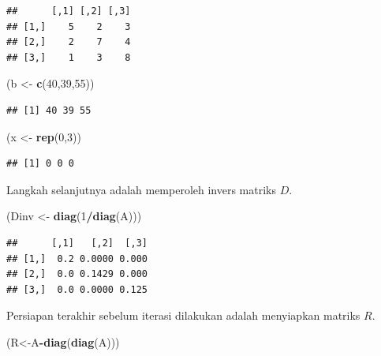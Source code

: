 \documentclass[
]{book}
\newenvironment{Shaded}{\begin{snugshade}}{\end{snugshade}}
\newcommand{\DecValTok}[1]{\textcolor[rgb]{0.00,0.00,0.81}{#1}}
\newcommand{\FunctionTok}[1]{\textcolor[rgb]{0.13,0.29,0.53}{\textbf{#1}}}
\newcommand{\NormalTok}[1]{#1}
\newcommand{\OtherTok}[1]{\textcolor[rgb]{0.56,0.35,0.01}{#1}}
\newcommand{\SpecialCharTok}[1]{\textcolor[rgb]{0.81,0.36,0.00}{\textbf{#1}}}
\theoremstyle{definition}
\theoremstyle{definition}
\theoremstyle{definition}
\theoremstyle{definition}
\theoremstyle{remark}
\begin{document}
\begin{verbatim}
##      [,1] [,2] [,3]
## [1,]    5    2    3
## [2,]    2    7    4
## [3,]    1    3    8
\end{verbatim}

\begin{Shaded}
\begin{Highlighting}[]
\NormalTok{(b }\OtherTok{\textless{}{-}} \FunctionTok{c}\NormalTok{(}\DecValTok{40}\NormalTok{,}\DecValTok{39}\NormalTok{,}\DecValTok{55}\NormalTok{))}
\end{Highlighting}
\end{Shaded}

\begin{verbatim}
## [1] 40 39 55
\end{verbatim}

\begin{Shaded}
\begin{Highlighting}[]
\NormalTok{(x }\OtherTok{\textless{}{-}} \FunctionTok{rep}\NormalTok{(}\DecValTok{0}\NormalTok{,}\DecValTok{3}\NormalTok{))}
\end{Highlighting}
\end{Shaded}

\begin{verbatim}
## [1] 0 0 0
\end{verbatim}

Langkah selanjutnya adalah memperoleh invers matriks \(D\).

\begin{Shaded}
\begin{Highlighting}[]
\NormalTok{(Dinv }\OtherTok{\textless{}{-}} \FunctionTok{diag}\NormalTok{(}\DecValTok{1}\SpecialCharTok{/}\FunctionTok{diag}\NormalTok{(A)))}
\end{Highlighting}
\end{Shaded}

\begin{verbatim}
##      [,1]   [,2]  [,3]
## [1,]  0.2 0.0000 0.000
## [2,]  0.0 0.1429 0.000
## [3,]  0.0 0.0000 0.125
\end{verbatim}

Persiapan terakhir sebelum iterasi dilakukan adalah menyiapkan matriks \(R\).

\begin{Shaded}
\begin{Highlighting}[]
\NormalTok{(R}\OtherTok{\textless{}{-}}\NormalTok{A}\SpecialCharTok{{-}}\FunctionTok{diag}\NormalTok{(}\FunctionTok{diag}\NormalTok{(A)))}
\end{Highlighting}
\end{Shaded}
\end{document}
